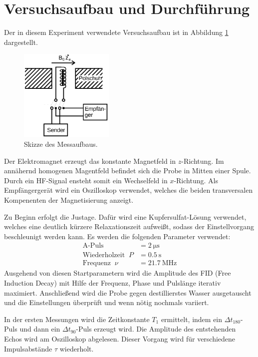\section{Versuchsaufbau und Durchführung}
\label{sec:Versuchaufbau}

Der in diesem Experiment verwendete Versuchsaufbau ist in Abbildung \ref{fig:plot4} dargestellt. 

\begin{figure}
  \centering
  \includegraphics[width=0.40\textwidth]{ressources/Aufbau.png}
  \caption{Skizze des Messaufbaus.}
  \label{fig:plot4}
\end{figure}


Der Elektromagnet erzeugt das konstante Magnetfeld in $z$-Richtung. Im annähernd homogenen Magentfeld befindet sich die Probe in Mitten einer Spule. Durch ein HF-Signal ensteht somit ein Wechselfeld in $x$-Richtung. Als Empfängergerät wird ein Oszilloskop verwendet, welches die beiden transversalen Kompenenten der Magnetisierung anzeigt.

Zu Beginn erfolgt die Justage. Dafür wird eine Kupfersulfat-Lösung verwendet, welches eine deutlich kürzere Relaxationszeit aufweißt, sodass der Einstellvorgang beschleunigt werden kann. Es werden die folgenden Parameter verwendet:
\begin{align}
	\text{A-Puls}&=\SI{2}{\micro\second}\\
	\text{Wiederholzeit} \;\;P &= \SI{0.5}{\second}\\
	\text{Frequenz}\;\; \nu &=\SI{21.7}{\mega\hertz}
\end{align}
Ausgehend von diesen Startparametern wird die Amplitude des FID (Free Induction Decay) mit Hilfe der Frequenz, Phase und Pulslänge iterativ maximiert. Anschließend wird die Probe gegen destillierstes Wasser ausgetauscht und die Einstellungen überprüft und wenn nötig nochmals variiert. 

In der ersten Messungen wird die Zeitkonstante $T_1$ ermittelt, indem ein $\Delta t_{180}$-Puls und dann ein $\Delta t_{90}$-Puls erzeugt wird. Die Amplitude des entstehenden Echos wird am Oszilloskop abgelesen. Dieser Vorgang wird für verschiedene Impulsabstände $\tau$ wiederholt.

